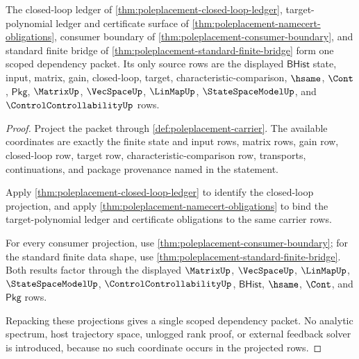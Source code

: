 \begin{theorem}\label{thm:poleplacement-scoped-dependency-packet}
The closed-loop ledger of \autoref{thm:poleplacement-closed-loop-ledger},
target-polynomial ledger and certificate surface of
\autoref{thm:poleplacement-namecert-obligations}, consumer boundary of
\autoref{thm:poleplacement-consumer-boundary}, and standard finite bridge of
\autoref{thm:poleplacement-standard-finite-bridge} form one scoped dependency
packet. Its only source rows are the displayed $\mathsf{BHist}$ state, input,
matrix, gain, closed-loop, target, characteristic-comparison, $\hsame$,
$\Cont$, $\mathsf{Pkg}$, $\MatrixUp$, $\VecSpaceUp$, $\LinMapUp$,
$\StateSpaceModelUp$, and $\ControlControllabilityUp$ rows.
\end{theorem}
\begin{proof}
Project the packet through \autoref{def:poleplacement-carrier}. The available
coordinates are exactly the finite state and input rows, matrix rows, gain row,
closed-loop row, target row, characteristic-comparison row, transports,
continuations, and package provenance named in the statement.

Apply \autoref{thm:poleplacement-closed-loop-ledger} to identify the closed-loop
projection, and apply \autoref{thm:poleplacement-namecert-obligations} to bind
the target-polynomial ledger and certificate obligations to the same carrier
rows.

For every consumer projection, use
\autoref{thm:poleplacement-consumer-boundary}; for the standard finite data
shape, use \autoref{thm:poleplacement-standard-finite-bridge}. Both results
factor through the displayed $\MatrixUp$, $\VecSpaceUp$, $\LinMapUp$,
$\StateSpaceModelUp$, $\ControlControllabilityUp$, $\mathsf{BHist}$, $\hsame$,
$\Cont$, and $\mathsf{Pkg}$ rows.

Repacking these projections gives a single scoped dependency packet. No
analytic spectrum, host trajectory space, unlogged rank proof, or external
feedback solver is introduced, because no such coordinate occurs in the
projected rows.
\end{proof}

